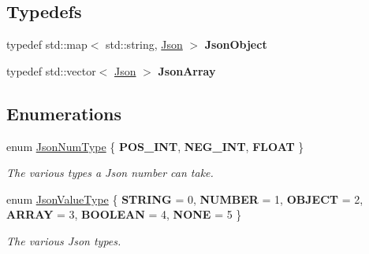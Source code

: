\subsection*{Typedefs}
\begin{DoxyCompactItemize}
\item 
\mbox{\label{namespacenta_1_1utils_aacec41f909698427351bd2d4e6bfb0ff}} 
typedef std\+::map$<$ std\+::string, \hyperlink{classnta_1_1utils_1_1Json}{Json} $>$ {\bfseries Json\+Object}
\item 
\mbox{\label{namespacenta_1_1utils_a016ff68f749b52514dae354976f110ea}} 
typedef std\+::vector$<$ \hyperlink{classnta_1_1utils_1_1Json}{Json} $>$ {\bfseries Json\+Array}
\end{DoxyCompactItemize}
\subsection*{Enumerations}
\begin{DoxyCompactItemize}
\item 
\mbox{\label{namespacenta_1_1utils_a83ee7c4cfccd9fa43564f5fe1c0c77d3}} 
enum \hyperlink{namespacenta_1_1utils_a83ee7c4cfccd9fa43564f5fe1c0c77d3}{Json\+Num\+Type} \{ {\bfseries P\+O\+S\+\_\+\+I\+NT}, 
{\bfseries N\+E\+G\+\_\+\+I\+NT}, 
{\bfseries F\+L\+O\+AT}
 \}\begin{DoxyCompactList}\small\item\em The various types a Json number can take. \end{DoxyCompactList}
\item 
\mbox{\label{namespacenta_1_1utils_ac9921c0a3baf86d9facdc4927c66def3}} 
enum \hyperlink{namespacenta_1_1utils_ac9921c0a3baf86d9facdc4927c66def3}{Json\+Value\+Type} \{ \newline
{\bfseries S\+T\+R\+I\+NG} = 0, 
{\bfseries N\+U\+M\+B\+ER} = 1, 
{\bfseries O\+B\+J\+E\+CT} = 2, 
{\bfseries A\+R\+R\+AY} = 3, 
\newline
{\bfseries B\+O\+O\+L\+E\+AN} = 4, 
{\bfseries N\+O\+NE} = 5
 \}\begin{DoxyCompactList}\small\item\em The various Json types. \end{DoxyCompactList}
\end{DoxyCompactItemize}

